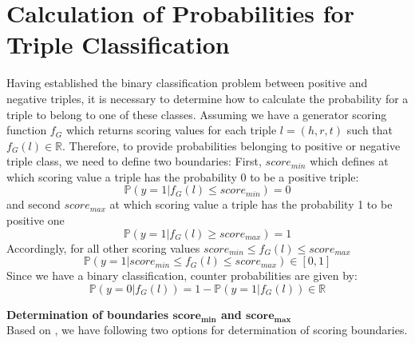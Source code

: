 \section{Calculation of Probabilities for Triple Classification}
\label{sec:calculation_of_probabilities_for_triple_classification}
Having established the binary classification problem between positive and negative triples, it is necessary to determine how to calculate the probability for a triple to belong to one of these classes.
Assuming we have a generator scoring function $f_G$ which returns scoring values for each triple $l = (h,r,t)$ such that $f_G(l) \in \mathbb{R}$.
Therefore, to provide probabilities belonging to positive or negative triple class, we need to define two boundaries:
First, $score_{min}$ which defines at which scoring value a triple has the probability 0 to be a positive triple: 
\begin{equation} \label{eqn:prob_score_min}
    \mathds{P}(y = 1 | f_G(l) \leq score_{min}) = 0
\end{equation}
and second $score_{max}$ at which scoring value a triple has the probability 1 to be positive one 
\begin{equation} \label{eqn:prob_score_max}
    \mathds{P}(y = 1 | f_G(l) \geq score_{max}) = 1
\end{equation}
Accordingly, for all other scoring values $score_{min} \leq f_G(l) \leq score_{max}$
\begin{equation} \label{eqn:prob_score_all}
    \mathds{P}(y = 1 | score_{min} \leq f_G(l) \leq score_{max}) \in [0, 1]
\end{equation}
Since we have a binary classification, counter probabilities are given by:
\begin{equation} \label{eqn:counter_prob}
    \mathds{P}(y = 0 | f_G(l)) = 1 - \mathds{P}(y = 1 | f_G(l)) \in \mathbb{R}
\end{equation}

\textbf{Determination of boundaries $\textbf{score}_{\textbf{min}}$ and $\textbf{score}_{\textbf{max}}$}\\
Based on , we have following two options for determination of scoring boundaries.

